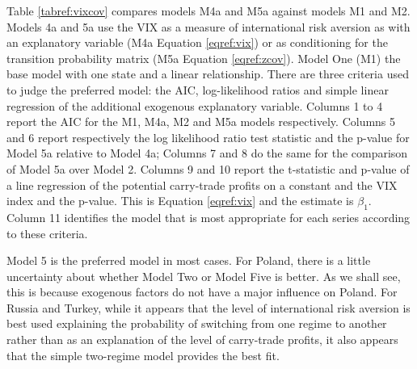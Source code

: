 \documentclass[12pt, a4paper, oneside]{article}\usepackage[]{graphicx}\usepackage[]{color}
\begin{document}
Table \ref{tabref:vixcov} compares models M4a and M5a against models M1 and M2.  Models 4a and 5a use the VIX as a measure of international risk aversion as with an explanatory variable (M4a Equation \ref{eqref:vix}) or as conditioning for the transition probability matrix (M5a Equation \ref{eqref:zcov}).  Model One (M1) the base model with one state and a linear relationship. There are three criteria used to judge the preferred model: the AIC, log-likelihood ratios and simple linear regression of the additional exogenous explanatory variable. Columns 1 to 4 report the AIC for the M1, M4a, M2 and M5a models respectively.  Columns 5 and 6 report respectively the log likelihood ratio test statistic and the p-value for Model 5a relative to Model 4a; Columns 7 and 8 do the same for the comparison of Model 5a over Model 2.  Columns 9 and 10 report the t-statistic and p-value of a line regression of the potential carry-trade profits on a constant and the VIX index and the p-value. This is Equation \ref{eqref:vix} and the estimate is $\beta_1$.  Column 11 identifies the model that is most appropriate for each series according to these criteria.

Model 5 is the preferred model in most cases.  For Poland, there is a little uncertainty about whether Model Two or Model Five is better.  As we shall see, this is because exogenous factors do not have a major influence on Poland. For Russia and Turkey, while it appears that the level of international risk aversion is best used explaining the probability of switching from one regime to another rather than as an explanation of the level of carry-trade profits, it also appears that the simple two-regime model provides the best fit.
\end{document}
